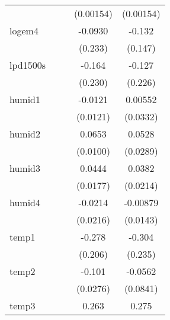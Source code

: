 {\begin{tabular}{l*{4}{c}}
            &                     &                     &   (0.00154)         &   (0.00154)         \\
[1em]
logem4      &                     &                     &     -0.0930         &      -0.132         \\
            &                     &                     &     (0.233)         &     (0.147)         \\
[1em]
lpd1500s    &                     &                     &      -0.164         &      -0.127         \\
            &                     &                     &     (0.230)         &     (0.226)         \\
[1em]
humid1      &                     &                     &     -0.0121         &     0.00552         \\
            &                     &                     &    (0.0121)         &    (0.0332)         \\
[1em]
humid2      &                     &                     &      0.0653\sym{***}&      0.0528         \\
            &                     &                     &    (0.0100)         &    (0.0289)         \\
[1em]
humid3      &                     &                     &      0.0444\sym{*}  &      0.0382         \\
            &                     &                     &    (0.0177)         &    (0.0214)         \\
[1em]
humid4      &                     &                     &     -0.0214         &    -0.00879         \\
            &                     &                     &    (0.0216)         &    (0.0143)         \\
[1em]
temp1       &                     &                     &      -0.278         &      -0.304         \\
            &                     &                     &     (0.206)         &     (0.235)         \\
[1em]
temp2       &                     &                     &      -0.101\sym{**} &     -0.0562         \\
            &                     &                     &    (0.0276)         &    (0.0841)         \\
[1em]
temp3       &                     &                     &       0.263\sym{**} &       0.275\sym{**} \\

\end{tabular}}
